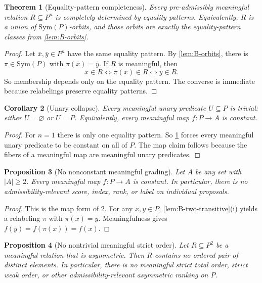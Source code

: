 \documentclass[11pt]{article}
\theoremstyle{plain}
\newtheorem{theorem}{Theorem}[section]
\newtheorem{proposition}[theorem]{Proposition}
\newtheorem{corollary}[theorem]{Corollary}
\theoremstyle{definition}
\begin{document}
\begin{theorem}[Equality-pattern completeness]
\label{thm:B-equality-pattern}
Every pre-admissibly meaningful relation $R\subseteq P^n$ is completely determined by equality patterns. Equivalently, $R$ is a union of $\mathrm{Sym}(P)$-orbits, and those orbits are exactly the equality-pattern classes from \cref{lem:B-orbits}.
\end{theorem}

\begin{proof}
Let $\bar x,\bar y\in P^n$ have the same equality pattern. By \cref{lem:B-orbits}, there is $\pi\in\mathrm{Sym}(P)$ with $\pi(\bar x)=\bar y$. If $R$ is meaningful, then
\[
\bar x\in R \Longleftrightarrow \pi(\bar x)\in R \Longleftrightarrow \bar y\in R.
\]
So membership depends only on the equality pattern. The converse is immediate because relabelings preserve equality patterns.
\end{proof}

\begin{corollary}[Unary collapse]
\label{cor:B-unary-collapse}
Every meaningful unary predicate $U\subseteq P$ is trivial: either $U=\varnothing$ or $U=P$. Equivalently, every meaningful map $f:P\to A$ is constant.
\end{corollary}

\begin{proof}
For $n=1$ there is only one equality pattern. So \cref{thm:B-equality-pattern} forces every meaningful unary predicate to be constant on all of $P$. The map claim follows because the fibers of a meaningful map are meaningful unary predicates.
\end{proof}

\begin{proposition}[No nonconstant meaningful grading]
\label{prop:B-no-grading}
Let $A$ be any set with $|A|\ge 2$. Every meaningful map $f:P\to A$ is constant. In particular, there is no admissibility-relevant score, index, rank, or label on individual proposals.
\end{proposition}

\begin{proof}
This is the map form of \cref{cor:B-unary-collapse}. For any $x,y\in P$, \cref{lem:B-two-transitive}(i) yields a relabeling $\pi$ with $\pi(x)=y$. Meaningfulness gives $f(y)=f(\pi(x))=f(x)$.
\end{proof}

\begin{proposition}[No nontrivial meaningful strict order]
\label{prop:B-no-order}
Let $R\subseteq P^2$ be a meaningful relation that is asymmetric. Then $R$ contains no ordered pair of distinct elements. In particular, there is no meaningful strict total order, strict weak order, or other admissibility-relevant asymmetric ranking on $P$.
\end{proposition}
\end{document}

